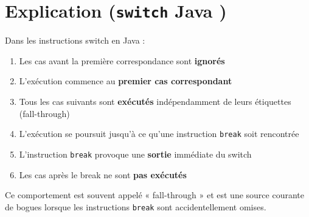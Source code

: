\documentclass{article}
\begin{document}
\noindent
\begin{minipage}[t]{0.39\textwidth}
\vspace{0pt}
\section*{Explication (\texttt{switch} Java \faJava)}
Dans les instructions switch en Java :
\begin{enumerate}
\item Les cas avant la première correspondance sont \textbf{ignorés}
 \item L'exécution commence au \textbf{premier cas correspondant}
 \item Tous les cas suivants sont \textbf{exécutés} indépendamment de leurs étiquettes (fall-through)
 \item L'exécution se poursuit jusqu'à ce qu'une instruction \texttt{break} soit rencontrée
 \item L'instruction \texttt{break} provoque une \textbf{sortie} immédiate du switch
 \item Les cas après le break ne sont \textbf{pas exécutés}
\end{enumerate}
Ce comportement est souvent appelé « fall-through » et est une source courante de bogues lorsque les instructions \texttt{break} sont accidentellement omises.
\end{minipage}
\hspace{0.9cm}
\end{document}
